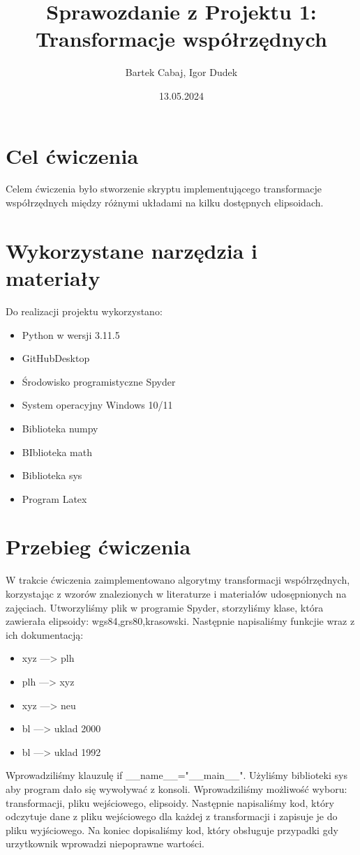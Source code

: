 \documentclass[11pt, a4paper]{article}
\title{{\Large \textbf{Sprawozdanie z Projektu 1: Transformacje współrzędnych}}}
\author{Bartek Cabaj, Igor Dudek}
\date{13.05.2024}
\begin{document}
	
	\maketitle
	\newpage
	\section{Cel ćwiczenia}
	Celem ćwiczenia było stworzenie skryptu implementującego transformacje współrzędnych między różnymi układami na kilku dostępnych elipsoidach.
	
	\section{Wykorzystane narzędzia i materiały}
	Do realizacji projektu wykorzystano:

	
	\begin{itemize}
		\item Python w wersji 3.11.5
		\item GitHubDesktop
		\item Środowisko programistyczne Spyder
		\item System operacyjny Windows 10/11
		\item Biblioteka numpy
		\item BIblioteka math
		\item Biblioteka sys
		\item Program Latex 
	\end{itemize}
	
	\section{Przebieg ćwiczenia}
	W trakcie ćwiczenia zaimplementowano algorytmy transformacji współrzędnych, korzystając z wzorów znalezionych w literaturze i materiałów udosępnionych na zajęciach. Utworzyliśmy plik w programie Spyder, storzyliśmy klase, która zawierała elipsoidy: wgs84,grs80,krasowski. Następnie napisaliśmy funkcjie wraz z ich dokumentacją:
	\begin{itemize}
		\item xyz ---> plh
		\item plh ---> xyz
		\item xyz ---> neu
		\item bl ---> uklad 2000
		\item bl ---> uklad 1992
		
	\end{itemize} 
	 Wprowadziliśmy klauzulę if \_\_name\_\_="\_\_main\_\_".
	 Użyliśmy biblioteki sys aby program dało się wywoływać z konsoli. Wprowadziliśmy możliwość wyboru: transformacji, pliku wejściowego, elipsoidy.
	 Następnie napisaliśmy kod, który odczytuje dane z pliku wejściowego dla każdej z transformacji i zapisuje je do pliku wyjściowego. Na koniec dopisaliśmy kod, który obsługuje przypadki gdy urzytkownik wprowadzi niepoprawne wartości.
	 
\end{document}
